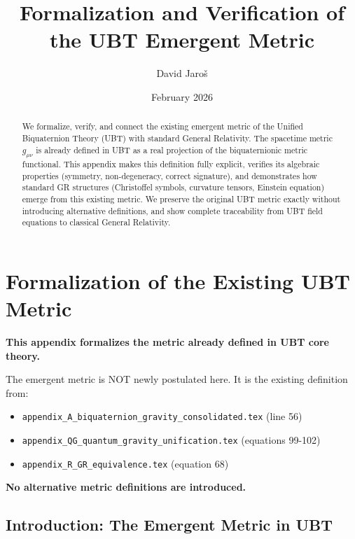\documentclass[12pt]{article}
\title{\textbf{Formalization and Verification of the UBT Emergent Metric}}
\author{David Jaroš}
\date{February 2026}
\theoremstyle{definition}
\theoremstyle{remark}
\begin{document}
  
  \maketitle
  
  \begin{abstract}
  We formalize, verify, and connect the existing emergent metric of the Unified Biquaternion Theory (UBT) with standard General Relativity. The spacetime metric $g_{\mu\nu}$ is already defined in UBT as a real projection of the biquaternionic metric functional. This appendix makes this definition fully explicit, verifies its algebraic properties (symmetry, non-degeneracy, correct signature), and demonstrates how standard GR structures (Christoffel symbols, curvature tensors, Einstein equation) emerge from this existing metric. We preserve the original UBT metric exactly without introducing alternative definitions, and show complete traceability from UBT field equations to classical General Relativity.
  \end{abstract}
\fi

\section{Formalization of the Existing UBT Metric}
\label{sec:formal_ubt_metric}

\begin{tcolorbox}[colback=blue!5!white,colframe=blue!75!black,title=Preservation of Existing UBT Metric]
\textbf{This appendix formalizes the metric already defined in UBT core theory.}

The emergent metric is NOT newly postulated here. It is the existing definition from:
\begin{itemize}
\item \texttt{appendix\_A\_biquaternion\_gravity\_consolidated.tex} (line 56)
\item \texttt{appendix\_QG\_quantum\_gravity\_unification.tex} (equations 99-102)
\item \texttt{appendix\_R\_GR\_equivalence.tex} (equation 68)
\end{itemize}

\textbf{No alternative metric definitions are introduced.}
\end{tcolorbox}

\subsection{Introduction: The Emergent Metric in UBT}
\end{document}
